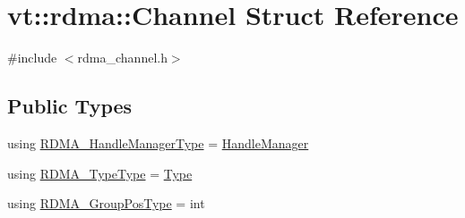 \hypertarget{structvt_1_1rdma_1_1_channel}{}\section{vt\+:\+:rdma\+:\+:Channel Struct Reference}
\label{structvt_1_1rdma_1_1_channel}


{\ttfamily \#include $<$rdma\+\_\+channel.\+h$>$}

\subsection*{Public Types}
\begin{DoxyCompactItemize}
\item 
using \hyperlink{structvt_1_1rdma_1_1_channel_ad558d07a917519f3e713fc41496a5ef7}{R\+D\+M\+A\+\_\+\+Handle\+Manager\+Type} = \hyperlink{structvt_1_1rdma_1_1_handle_manager}{Handle\+Manager}
\item 
using \hyperlink{structvt_1_1rdma_1_1_channel_aaf1a80b6dd527e4876de77bcd58a7330}{R\+D\+M\+A\+\_\+\+Type\+Type} = \hyperlink{namespacevt_1_1rdma_ac848e1d9da43db6294bd06f83e5d3946}{Type}
\item 
using \hyperlink{structvt_1_1rdma_1_1_channel_ae67759ab26cc035489edd369ae207cfc}{R\+D\+M\+A\+\_\+\+Group\+Pos\+Type} = int
\end{DoxyCompactItemize}

